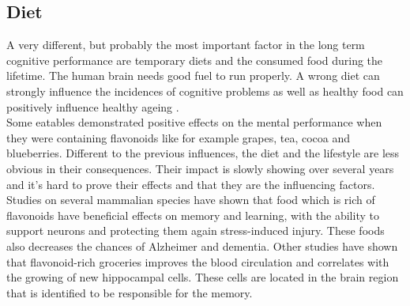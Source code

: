 \subsection{Diet}
A very different, but probably the most important factor in the long term cognitive performance are temporary diets and the consumed food during the lifetime. The human brain needs good fuel to run properly. A wrong diet can strongly influence the incidences of cognitive problems as well as healthy food can positively influence healthy ageing \cite{spencer2008food}.\\
Some eatables demonstrated positive effects on the mental performance when they were containing flavonoids like for example grapes, tea, cocoa and blueberries. 
Different to the previous influences, the diet and the lifestyle are less obvious in their consequences. Their impact is slowly showing over several years and it's hard to prove their effects and that they are the influencing factors.\\
Studies on several mammalian species have shown that food which is rich of flavonoids have beneficial effects on memory and learning, with the ability to support neurons and protecting them again stress-induced injury.
These foods also decreases the chances of Alzheimer and dementia. Other studies have shown that flavonoid-rich groceries improves the blood circulation and correlates with the growing of new hippocampal cells. These cells are located in the brain region that is identified to be responsible for the memory.